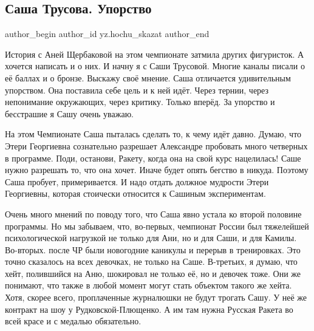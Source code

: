  
 
 
 
 
\subsection{Саша Трусова. Упорство}
\label{sec:18_01_2022.yz.hochu_skazat.1.trusova}

\ifcmt
 author_begin
   author_id yz.hochu_skazat
 author_end
\fi

История с Аней Щербаковой на этом чемпионате затмила других фигуристок. А
хочется написать и о них. И начну я с Саши Трусовой. Многие каналы писали о её
баллах и о бронзе. Выскажу своё мнение. Саша отличается удивительным упорством.
Она поставила себе цель и к ней идёт. Через тернии, через непонимание
окружающих, через критику. Только вперёд. За упорство и бесстрашие я Сашу очень
уважаю.


На этом Чемпионате Саша пыталась сделать то, к чему идёт давно. Думаю, что
Этери Георгиевна сознательно разрешает Александре пробовать много четверных в
программе. Поди, останови, Ракету, когда она на свой курс нацелилась! Саше
нужно разрешать то, что она хочет. Иначе будет опять бегство в никуда. Поэтому
Саша пробует, примеривается. И надо отдать должное мудрости Этери Георгиевны,
которая стоически относится к Сашиным экспериментам.


Очень много мнений по поводу того, что Саша явно устала ко второй половине
программы. Но мы забываем, что, во-первых, чемпионат России был тяжелейшей
психологической нагрузкой не только для Ани, но и для Саши, и для Камилы.
Во-вторых. после ЧР были новогодние каникулы и перерыв в тренировках. Это точно
сказалось на всех девочках, не только на Саше. В-третьих, я думаю, что хейт,
полившийся на Аню, шокировал не только её, но и девочек тоже. Они же понимают,
что также в любой момент могут стать объектом такого же хейта. Хотя, скорее
всего, проплаченные журналюшки не будут трогать Сашу. У неё же контракт на шоу
у Рудковской-Плющенко. А им там нужна Русская Ракета во всей красе и с медалью
обязательно. 

